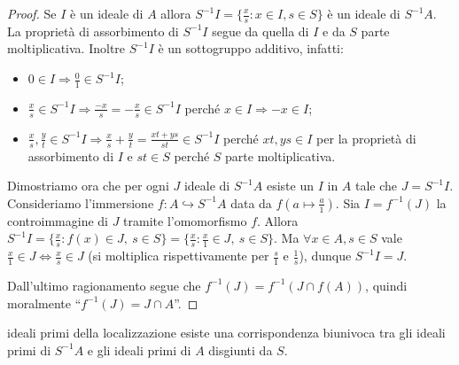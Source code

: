 \begin{proof}
    Se $I$ è un ideale di $A$ allora $S^{-1}I = \{ \frac{x}{s} : x \in I,s\in S\}$ è un ideale di $S^{-1}A$. La proprietà di assorbimento di $S^{-1}I$ segue da quella di $I$ e da $S$ parte moltiplicativa. Inoltre $S^{-1}I$ è un sottogruppo additivo, infatti:
    \begin{itemize}
        \item $0 \in I \Rightarrow \frac{0}{1} \in S^{-1}I$;
        \item $\frac{x}{s} \in S^{-1}I  \Rightarrow \frac{-x}{s} = - \frac{x}{s} \in S^{-1}I$ perché $x \in I \Rightarrow -x \in I$;
        \item $ \frac{x}{s}, \frac{y}{t} \in S^{-1}I  \Rightarrow \frac{x}{s}+\frac{y}{t} =\frac{xt+ys}{st} \in S^{-1}I$ perché $xt, ys \in I$ per la proprietà di assorbimento di $I$ e $st \in S$ perché $S$ parte moltiplicativa.
    \end{itemize}
    Dimostriamo ora che per ogni $J$ ideale di $S^{-1}A$ esiste un $I$ in $A$ tale che $J = S^{-1}I$. Consideriamo l'immersione $f: A \hookrightarrow S^{-1}A$ data da $f(a \mapsto \frac{a}{1})$. Sia $I = f^{-1}(J)$ la controimmagine di $J$ tramite l'omomorfismo $f$. Allora $S^{-1}I = \{ \frac{x}{s} : f(x) \in J,  \ s \in S\} = \{ \frac{x}{s} : \frac{x}{1} \in J, \ s \in S\}$. Ma $\forall x \in A, s \in S$ vale $\frac{x}{1} \in J \iff \frac{x}{s} \in J$ (si moltiplica rispettivamente per $\frac{s}{1}$ e $\frac{1}{s}$), dunque $S^{-1}I = J$.
    
    Dall'ultimo ragionamento segue che $f^{-1}(J) = f^{-1}(J \cap f(A))$, quindi moralmente ``$f^{-1}(J) = J \cap A$''.
    \end{proof}
\begin{theorem}{ideali primi della localizzazione}
    esiste una corrispondenza biunivoca tra gli ideali primi di $S^{-1}A$ e gli ideali primi di $A$ disgiunti da $S$.
\end{theorem}
